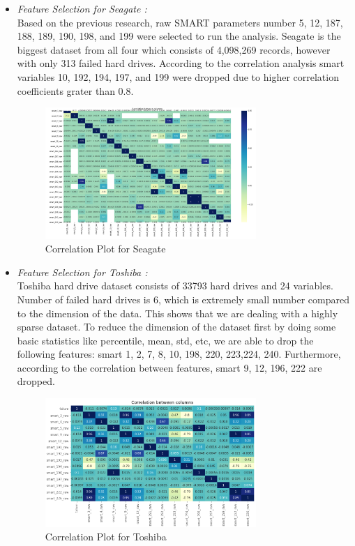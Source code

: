 \documentclass[conference]{IEEEtran}
\begin{document}
\begin{itemize}
    
    
    
    \item \textit{Feature Selection for Seagate :}\\
       Based on the previous research, raw SMART parameters number 5, 12, 187, 188, 189, 190, 198, and 199 were selected to run the analysis. Seagate is the biggest dataset from all four which consists of 4,098,269 records, however with only 313 failed hard drives. According to the correlation analysis smart variables 10, 192, 194, 197, and 199 were dropped due to higher correlation coefficients grater than 0.8.\\
       
        \begin{figure}[htbp]
        \centerline{\includegraphics[width = 8cm]{Asanga/sgt_corr.PNG}}
        \caption{Correlation Plot for Seagate}
        \label{fig}
    \end{figure}
   

 
    
    
    \item \textit{Feature Selection for Toshiba :}\\
    Toshiba hard drive dataset consists of 33793 hard drives and 24 variables. Number of failed hard drives is 6, which is extremely small number compared to the dimension of the data. This shows that we are dealing with a highly sparse dataset. To reduce the dimension of the dataset first by doing some basic statistics like percentile, mean, std, etc, we are able to drop the following features: smart 1, 2, 7, 8, 10, 198, 220, 223,224, 240. Furthermore, according to the correlation between features, smart 9, 12, 196, 222 are dropped.
    
     \begin{figure}[htbp]
        \centerline{\includegraphics[width = 8cm]{Shadi/corr.PNG}}
        \caption{Correlation Plot for Toshiba}
        \label{fig}
    \end{figure}
    
\end{itemize}
\end{document}
